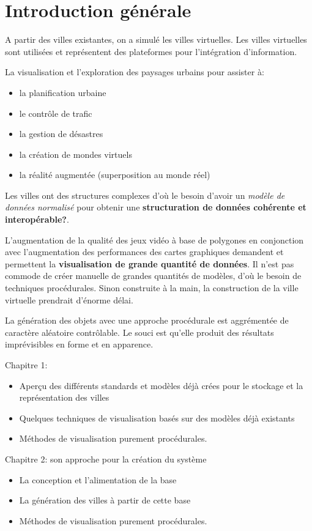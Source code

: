 \documentclass[11pt]{report}
\begin{document}
\section*{Introduction générale}

A partir des villes existantes, on a simulé les villes virtuelles.
Les villes virtuelles sont utilisées et représentent des plateformes pour l'intégration d'information.\newline

La visualisation et l'exploration des paysages urbains pour assister à:
\begin{itemize}
\item la planification urbaine 
\item le contrôle de trafic
\item la gestion de désastres
\item la création de mondes virtuels
\item la réalité augmentée (superposition au monde réel)
\end{itemize}

Les villes ont des structures complexes d'où le besoin d'avoir un \textit{modèle de données normalisé} pour obtenir une \textbf{structuration de données cohérente et interopérable?}.

L'augmentation de la qualité des jeux vidéo à base de polygones en conjonction avec l'augmentation des performances des cartes graphiques demandent et permettent la \textbf{visualisation de grande quantité de données}. Il n'est pas commode de créer manuelle de grandes quantités de modèles, d'où le besoin de techniques procédurales. 
Sinon construite à la main, la construction de la ville virtuelle prendrait d'énorme délai.

La génération des objets avec une approche procédurale est aggrémentée de caractère aléatoire contrôlable.
Le souci est qu'elle produit des résultats imprévisibles en forme et en apparence.

Chapitre 1: 
\begin{itemize}
\item Aperçu des différents standards et modèles déjà crées pour le stockage et la représentation des villes
\item Quelques techniques de visualisation basés sur des modèles déjà existants
\item Méthodes de visualisation purement procédurales.
\end{itemize}

Chapitre 2: son approche pour la création du système
\begin{itemize}
\item La conception et l’alimentation de la base
\item La génération des villes à partir de cette base
\item Méthodes de visualisation purement procédurales.
\end{itemize}
\end{document}
